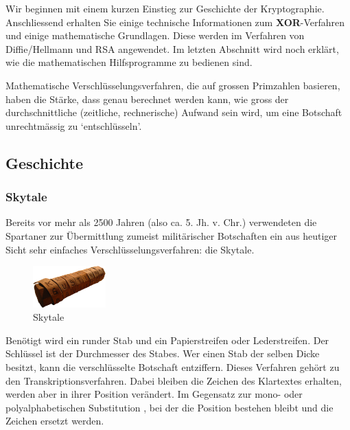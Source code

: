 Wir beginnen mit einem kurzen Einstieg zur Geschichte der Kryptographie.
Anschliessend erhalten Sie einige technische Informationen zum \textbf{XOR}-Verfahren
 und einige
mathematische Grundlagen. Diese werden im Verfahren von Diffie/Hellmann und
RSA  angewendet.
Im letzten Abschnitt  wird noch erklärt, wie die mathematischen
Hilfsprogramme zu bedienen sind.

Mathematische Verschlüsselungsverfahren, die auf grossen Primzahlen basieren,
haben die Stärke, dass genau berechnet werden kann, wie gross der durchschnittliche
(zeitliche, rechnerische) Aufwand sein wird, um eine Botschaft unrechtmässig
zu `entschlüsseln'.

\subsection{Geschichte}
\subsubsection*{Skytale}

Bereits vor mehr als 2500 Jahren (also ca. 5. Jh. v. Chr.) verwendeten die
Spartaner zur Übermittlung zumeist militärischer Botschaften ein aus heutiger
Sicht sehr einfaches Verschlüsselungsverfahren: die Skytale.

\begin{figure}
    \begin{center}
        \includegraphics[width=0.25\textwidth]{images/Skytale.png}
    \end{center}
    \caption{Skytale}
\end{figure}

Benötigt wird ein runder Stab und ein Papierstreifen oder Lederstreifen.
Der Schlüssel ist der Durchmesser des Stabes. Wer einen Stab der selben
Dicke besitzt, kann die verschlüsselte Botschaft entziffern. Dieses
Verfahren gehört zu den Transkriptionsverfahren. Dabei bleiben die
Zeichen des Klartextes erhalten, werden aber in ihrer Position verändert.
Im Gegensatz zur mono- oder polyalphabetischen Substitution
, bei der die
Position bestehen bleibt und die Zeichen ersetzt werden.

